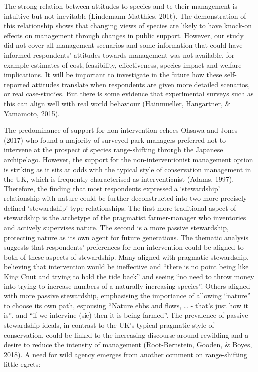 \documentclass[
]{article}
\begin{document}
The strong relation between attitudes to species and to their management
is intuitive but not inevitable (Lindemann-Matthies, 2016). The
demonstration of this relationship shows that changing views of species
are likely to have knock-on effects on management through changes in
public support. However, our study did not cover all management
scenarios and some information that could have informed respondents'
attitudes towards management was not available, for example estimates of
cost, feasibility, effectiveness, species impact and welfare
implications. It will be important to investigate in the future how
these self-reported attitudes translate when respondents are given more
detailed scenarios, or real case-studies. But there is some evidence
that experimental surveys such as this can align well with real world
behaviour (Hainmueller, Hangartner, \& Yamamoto, 2015).

The predominance of support for non-intervention echoes Ohsawa and Jones
(2017) who found a majority of surveyed park managers preferred not to
intervene at the prospect of species range-shifting through the Japanese
archipelago. However, the support for the non-interventionist management
option is striking as it sits at odds with the typical style of
conservation management in the UK, which is frequently characterised as
interventionist (Adams, 1997). Therefore, the finding that most
respondents expressed a `stewardship' relationship with nature could be
further deconstructed into two more precisely defined `stewardship'-type
relationships. The first more traditional aspect of stewardship is the
archetype of the pragmatist farmer-manager who inventories and actively
supervises nature. The second is a more passive stewardship, protecting
nature as its own agent for future generations. The thematic analysis
suggests that respondents' preferences for non-intervention could be
aligned to both of these aspects of stewardship. Many aligned with
pragmatic stewardship, believing that intervention would be ineffective
and ``there is no point being like King Cnut and trying to hold the tide
back'' and seeing ``no need to throw money into trying to increase
numbers of a naturally increasing species''. Others aligned with more
passive stewardship, emphasising the importance of allowing ``nature''
to choose its own path, espousing ``Nature ebbs and flows, \ldots{} -
that's just how it is'', and ``if we intervine (sic) then it is being
farmed''. The prevalence of passive stewardship ideals, in contrast to
the UK's typical pragmatic style of conservation, could be linked to the
increasing discourse around rewilding and a desire to reduce the
intensity of management (Root-Bernstein, Gooden, \& Boyes, 2018). A need
for wild agency emerges from another comment on range-shifting little
egrets:
\end{document}
